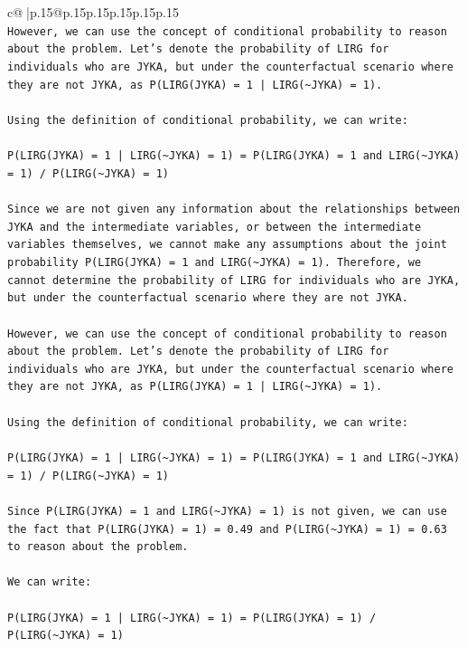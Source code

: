 \documentclass{article}
\begin{document}
{\begin{supertabular}{c@{$\;$}|p{.15\linewidth}@{}p{.15\linewidth}p{.15\linewidth}p{.15\linewidth}p{.15\linewidth}p{.15\linewidth}}
{{{\\ 
\texttt{However, we can use the concept of conditional probability to reason about the problem. Let's denote the probability of LIRG for individuals who are JYKA, but under the counterfactual scenario where they are not JYKA, as P(LIRG(JYKA) = 1 | LIRG(\textasciitilde{}JYKA) = 1).} \\
\\ 
\texttt{Using the definition of conditional probability, we can write:} \\
\\ 
\texttt{P(LIRG(JYKA) = 1 | LIRG(\textasciitilde{}JYKA) = 1) = P(LIRG(JYKA) = 1 and LIRG(\textasciitilde{}JYKA) = 1) / P(LIRG(\textasciitilde{}JYKA) = 1)} \\
\\ 
\texttt{Since we are not given any information about the relationships between JYKA and the intermediate variables, or between the intermediate variables themselves, we cannot make any assumptions about the joint probability P(LIRG(JYKA) = 1 and LIRG(\textasciitilde{}JYKA) = 1). Therefore, we cannot determine the probability of LIRG for individuals who are JYKA, but under the counterfactual scenario where they are not JYKA.} \\
\\ 
\texttt{However, we can use the concept of conditional probability to reason about the problem. Let's denote the probability of LIRG for individuals who are JYKA, but under the counterfactual scenario where they are not JYKA, as P(LIRG(JYKA) = 1 | LIRG(\textasciitilde{}JYKA) = 1).} \\
\\ 
\texttt{Using the definition of conditional probability, we can write:} \\
\\ 
\texttt{P(LIRG(JYKA) = 1 | LIRG(\textasciitilde{}JYKA) = 1) = P(LIRG(JYKA) = 1 and LIRG(\textasciitilde{}JYKA) = 1) / P(LIRG(\textasciitilde{}JYKA) = 1)} \\
\\ 
\texttt{Since P(LIRG(JYKA) = 1 and LIRG(\textasciitilde{}JYKA) = 1) is not given, we can use the fact that P(LIRG(JYKA) = 1) = 0.49 and P(LIRG(\textasciitilde{}JYKA) = 1) = 0.63 to reason about the problem.} \\
\\ 
\texttt{We can write:} \\
\\ 
\texttt{P(LIRG(JYKA) = 1 | LIRG(\textasciitilde{}JYKA) = 1) = P(LIRG(JYKA) = 1) / P(LIRG(\textasciitilde{}JYKA) = 1)} \\
}}}
\end{supertabular}}
\end{document}
